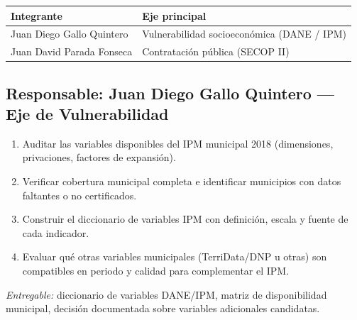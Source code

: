 \documentclass[11pt,letterpaper]{article}
\newenvironment{recuadro}[1]{%
  \begin{tcolorbox}[breakable,colback=boxbg,colframe=ustablue,boxrule=0.6pt,arc=1.5pt,
  title={\small\bfseries #1},fonttitle=\small,coltitle=white,colbacktitle=ustablue,
  left=6pt,right=6pt,top=4pt,bottom=4pt]
}{\end{tcolorbox}}
\begin{document}
\begin{center}
\small
\begin{tabular}{ll}
\toprule
\textbf{Integrante} & \textbf{Eje principal} \\
\midrule
Juan Diego Gallo Quintero & Vulnerabilidad socioeconómica (DANE / IPM) \\
Juan David Parada Fonseca & Contratación pública (SECOP II) \\
\bottomrule
\end{tabular}
\end{center}

\subsection{Responsable: Juan Diego Gallo Quintero --- Eje de Vulnerabilidad}

\begin{recuadro}{Fase 2 (parte DANE/IPM) --- Revisión de datos y fuentes}
\begin{enumerate}
\item Auditar las variables disponibles del IPM municipal 2018 (dimensiones,
privaciones, factores de expansión).
\item Verificar cobertura municipal completa e identificar municipios con
datos faltantes o no certificados.
\item Construir el diccionario de variables IPM con definición, escala y
fuente de cada indicador.
\item Evaluar qué otras variables municipales (TerriData/DNP u otras) son
compatibles en periodo y calidad para complementar el IPM.
\end{enumerate}
\textit{Entregable:} diccionario de variables DANE/IPM, matriz de
disponibilidad municipal, decisión documentada sobre variables adicionales
candidatas.
\end{recuadro}
\end{document}
